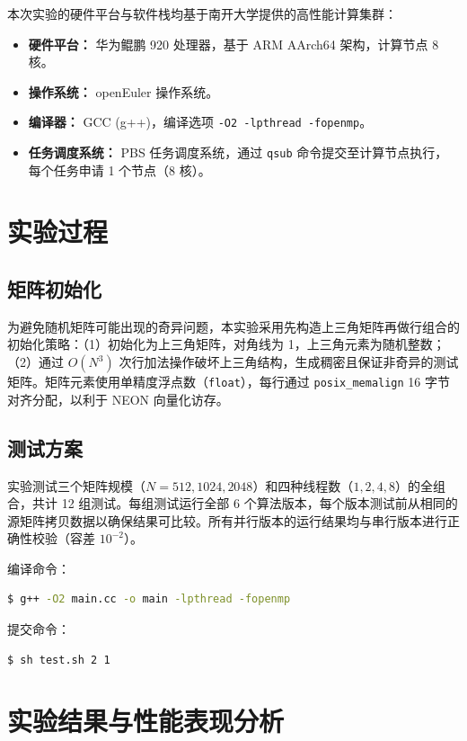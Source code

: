 \documentclass[a4paper]{article}
\begin{document}
本次实验的硬件平台与软件栈均基于南开大学提供的高性能计算集群：

\begin{itemize}
    \item \textbf{硬件平台：} 华为鲲鹏 920 处理器，基于 ARM AArch64 架构，计算节点 8 核。
    \item \textbf{操作系统：} openEuler 操作系统。
    \item \textbf{编译器：} GCC (g++)，编译选项 \texttt{-O2 -lpthread -fopenmp}。
    \item \textbf{任务调度系统：} PBS 任务调度系统，通过 \texttt{qsub} 命令提交至计算节点执行，每个任务申请 1 个节点（8 核）。
\end{itemize}

\section{实验过程}

\subsection{矩阵初始化}

为避免随机矩阵可能出现的奇异问题，本实验采用先构造上三角矩阵再做行组合的初始化策略：（1）初始化为上三角矩阵，对角线为 1，上三角元素为随机整数；（2）通过 $O(N^3)$ 次行加法操作破坏上三角结构，生成稠密且保证非奇异的测试矩阵。矩阵元素使用单精度浮点数（\texttt{float}），每行通过 \texttt{posix\_memalign} 16 字节对齐分配，以利于 NEON 向量化访存。

\subsection{测试方案}

实验测试三个矩阵规模（$N = 512, 1024, 2048$）和四种线程数（$1, 2, 4, 8$）的全组合，共计 12 组测试。每组测试运行全部 6 个算法版本，每个版本测试前从相同的源矩阵拷贝数据以确保结果可比较。所有并行版本的运行结果均与串行版本进行正确性校验（容差 $10^{-2}$）。

编译命令：
\begin{lstlisting}[language=bash, frame=single, numbers=none]
$ g++ -O2 main.cc -o main -lpthread -fopenmp
\end{lstlisting}

提交命令：
\begin{lstlisting}[language=bash, frame=single, numbers=none]
$ sh test.sh 2 1
\end{lstlisting}

\section{实验结果与性能表现分析}
\end{document}
